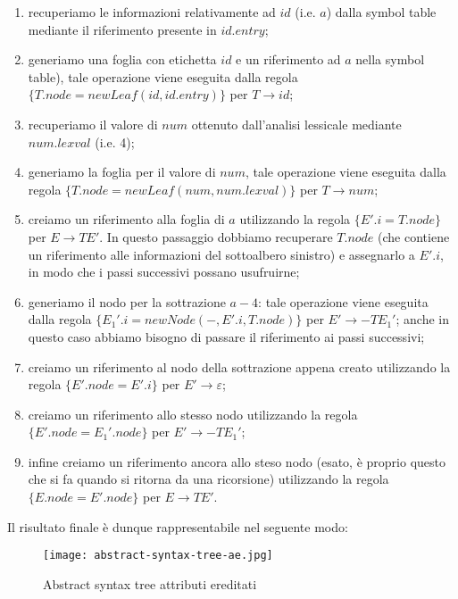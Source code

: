 \documentclass[class=book, crop=false, oneside, 12pt]{standalone}
\begin{document}
\begin{enumerate}
    \item recuperiamo le informazioni relativamente ad \(id\) (i.e. \(a\)) dalla symbol table mediante il riferimento presente in \(id.entry\);
    \item generiamo una foglia con etichetta \(id\) e un riferimento ad \(a\) nella symbol table), tale operazione viene eseguita dalla regola \(\{T.node = newLeaf(id, id.entry)\}\) per  \(T \to id\);
    \item recuperiamo il valore di \(num\) ottenuto dall'analisi lessicale mediante \(num.lexval\) (i.e. 4);
    \item generiamo la foglia per il valore di \(num\), tale operazione viene eseguita dalla regola \(\{T.node = newLeaf(num, num.lexval)\}\) per \(T \to num\);
    \item creiamo un riferimento alla foglia di \(a\) utilizzando la regola \(\{E'.i = T.node\}\) per  \(E \to TE'\). In questo passaggio dobbiamo recuperare \(T.node\) (che contiene un riferimento alle informazioni del sottoalbero sinistro) e assegnarlo a \(E'.i\), in modo che i passi successivi possano usufruirne;
    \item generiamo il nodo per la sottrazione \(a-4\): tale operazione viene eseguita dalla regola \(\{E_{1}'.i = newNode(-, E'.i, T.node)\}\) per \(E' \to -TE_{1}'\); anche in questo caso abbiamo bisogno di passare il riferimento ai passi successivi;
    \item creiamo un riferimento al nodo della sottrazione appena creato utilizzando la regola \(\{E'.node = E'.i\}\) per \(E' \to \varepsilon\);
    \item creiamo un riferimento allo stesso nodo utilizzando la regola \(\{E'.node = E_{1}'.node\}\) per \(E' \to -TE_{1}'\);
    \item infine creiamo un riferimento ancora allo steso nodo (esato, è proprio questo che si fa quando si ritorna da una ricorsione) utilizzando la regola \(\{E.node = E'.node\}\) per \(E \to TE'\).
\end{enumerate}

Il risultato finale è dunque rappresentabile nel seguente modo:

\begin{figure}[H]
	\centering
    \texttt{[image: abstract-syntax-tree-ae.jpg]}
    \caption{Abstract syntax tree attributi ereditati}
    \label{fig:abstract-syntax-tree-ae}
\end{figure}
\end{document}
